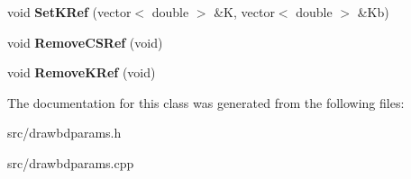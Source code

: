 \begin{DoxyCompactItemize}
\item 
\hypertarget{class_draw_b_d_params_a67ed6b002458411e37a0814cf157b50e}{}void {\bfseries Set\+K\+Ref} (vector$<$ double $>$ \&K, vector$<$ double $>$ \&Kb)\label{class_draw_b_d_params_a67ed6b002458411e37a0814cf157b50e}

\item 
\hypertarget{class_draw_b_d_params_abb9e4fc31c3ced4166c3650adc8b455b}{}void {\bfseries Remove\+C\+S\+Ref} (void)\label{class_draw_b_d_params_abb9e4fc31c3ced4166c3650adc8b455b}

\item 
\hypertarget{class_draw_b_d_params_a41eb94b6945e08ff03ff8d886ad1518b}{}void {\bfseries Remove\+K\+Ref} (void)\label{class_draw_b_d_params_a41eb94b6945e08ff03ff8d886ad1518b}

\end{DoxyCompactItemize}


The documentation for this class was generated from the following files\+:\begin{DoxyCompactItemize}
\item 
src/drawbdparams.\+h\item 
src/drawbdparams.\+cpp\end{DoxyCompactItemize}
